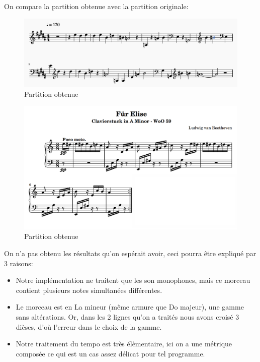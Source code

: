 \documentclass[french,]{article}
\providecommand{\tightlist}{%
  \setlength{\itemsep}{0pt}\setlength{\parskip}{0pt}}
\begin{document}
On compare la partition obtenue avec la partition originale:

\begin{figure}
\centering
\includegraphics{img/fur_elise_midi.png}
\caption{Partition obtenue}
\end{figure}

\begin{figure}
\centering
\includegraphics{img/fur_elise_partition.png}
\caption{Partition obtenue}
\end{figure}

On n'a pas obtenu les résultats qu'on espérait avoir, ceci pourra être
expliqué par 3 raisons:

\begin{itemize}
\tightlist
\item
  Notre implémentation ne traitent que les son monophones, mais ce
  morceau contient plusieurs notes simultanées différentes.
\item
  Le morceau est en La mineur (même armure que Do majeur), une gamme
  sans altérations. Or, dans les 2 lignes qu'on a traités nous avons
  croisé 3 dièses, d'où l'erreur dans le choix de la gamme.
\item
  Notre traitement du tempo est très élèmentaire, ici on a une métrique
  composée ce qui est un cas assez délicat pour tel programme.
\end{itemize}
\end{document}
